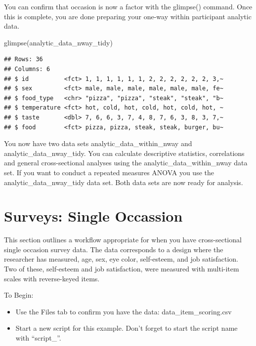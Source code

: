 \documentclass[
]{krantz}
\makeatletter
\newenvironment{Shaded}{\begin{snugshade}}{\end{snugshade}}
\newcommand{\FunctionTok}[1]{\textcolor[rgb]{0,0,0}{#1}}
\newcommand{\NormalTok}[1]{#1}
\newenvironment{kframe}{%
\medskip{}
\setlength{\fboxsep}{.8em}
 \def\at@end@of@kframe{}%
 \ifinner\ifhmode%
  \def\at@end@of@kframe{\end{minipage}}%
  \begin{minipage}{\columnwidth}%
 \fi\fi%
 \def\FrameCommand##1{\hskip\@totalleftmargin \hskip-\fboxsep
 \colorbox{shadecolor}{##1}\hskip-\fboxsep
     \hskip-\linewidth \hskip-\@totalleftmargin \hskip\columnwidth}%
 \MakeFramed {\advance\hsize-\width
   \@totalleftmargin\z@ \linewidth\hsize
   \@setminipage}}%
 {\par\unskip\endMakeFramed%
 \at@end@of@kframe}
\renewenvironment{Shaded}{\begin{kframe}}{\end{kframe}}
\makeatother
\begin{document}
You can confirm that occasion is now a factor with the glimpse() command. Once this is complete, you are done preparing your one-way within participant analytic data.

\begin{Shaded}
\begin{Highlighting}[]
\FunctionTok{glimpse}\NormalTok{(analytic\_data\_nway\_tidy)}
\end{Highlighting}
\end{Shaded}

\begin{verbatim}
## Rows: 36
## Columns: 6
## $ id          <fct> 1, 1, 1, 1, 1, 1, 2, 2, 2, 2, 2, 2, 3,~
## $ sex         <fct> male, male, male, male, male, male, fe~
## $ food_type   <chr> "pizza", "pizza", "steak", "steak", "b~
## $ temperature <fct> hot, cold, hot, cold, hot, cold, hot, ~
## $ taste       <dbl> 7, 6, 6, 3, 7, 4, 8, 7, 6, 3, 8, 3, 7,~
## $ food        <fct> pizza, pizza, steak, steak, burger, bu~
\end{verbatim}

You now have two data sets analytic\_data\_within\_nway and analytic\_data\_nway\_tidy. You can calculate descriptive statistics, correlations and general cross-sectional analyses using the analytic\_data\_within\_nway data set. If you want to conduct a repeated measures ANOVA you use the analytic\_data\_nway\_tidy data set. Both data sets are now ready for analysis.

\hypertarget{surveys-single-occassion}{%
\section{Surveys: Single Occassion}\label{surveys-single-occassion}}

This section outlines a workflow appropriate for when you have cross-sectional single occasion survey data. The data corresponds to a design where the researcher has measured, age, sex, eye color, self-esteem, and job satisfaction. Two of these, self-esteem and job satisfaction, were measured with multi-item scales with reverse-keyed items.

To Begin:

\begin{itemize}
\item
  Use the Files tab to confirm you have the data: data\_item\_scoring.csv
\item
  Start a new script for this example. Don't forget to start the script name with ``script\_''.
\end{itemize}
\end{document}
